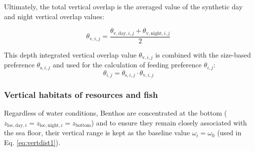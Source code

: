 \documentclass[
]{article}
\begin{document}
Ultimately, the total vertical overlap is the averaged value of the
synthetic day and night vertical overlap values:

\begin{equation}
  \theta_{\mathrm{v},i,j} = \frac{\theta_{\mathrm{v},\mathrm{day},i,j}+\theta_{\mathrm{v},\mathrm{night},i,j}}{2}
  \label{eq:vertover}
\end{equation}

This depth integrated vertical overlap value \(\theta_{\mathrm{v},i,j}\)
is combined with the size-based preference \(\theta_{\mathrm{s},i,j}\)
and used for the calculation of feeding preference \(\theta_{i,j}\):
\begin{equation}
\theta_{i,j} = \theta_{\mathrm{s},i,j} \cdot\theta_{\mathrm{v},i,j} 
\label{eq:verttheta}
\end{equation}

\subsubsection{Vertical habitats of resources and
fish}\label{vertical-habitats-of-resources-and-fish}

Regardless of water conditions, Benthos are concentrated at the bottom
(\(z_{\mathrm{loc},\mathrm{day},i} = z_{\mathrm{loc},\mathrm{night},i} = z_{\mathrm{bottom}}\))
and to ensure they remain closely associated with the sea floor, their
vertical range is kept as the baseline value \(\omega_i=\omega_0\) (used
in Eq. \ref{eq:vertdist1}).
\end{document}
